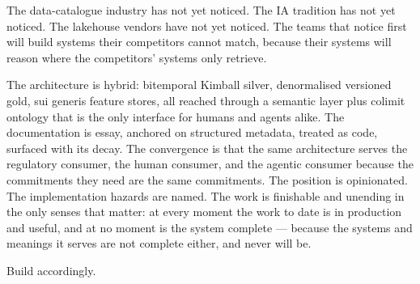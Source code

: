 \documentclass[11pt,a4paper]{article}
\begin{document}
The data-catalogue industry has not yet noticed. The IA tradition has not yet noticed. The lakehouse vendors have not yet noticed. The teams that notice first will build systems their competitors cannot match, because their systems will reason where the competitors' systems only retrieve.

The architecture is hybrid: bitemporal Kimball silver, denormalised versioned gold, sui generis feature stores, all reached through a semantic layer plus colimit ontology that is the only interface for humans and agents alike. The documentation is essay, anchored on structured metadata, treated as code, surfaced with its decay. The convergence is that the same architecture serves the regulatory consumer, the human consumer, and the agentic consumer because the commitments they need are the same commitments. The position is opinionated. The implementation hazards are named. The work is finishable and unending in the only senses that matter: at every moment the work to date is in production and useful, and at no moment is the system complete --- because the systems and meanings it serves are not complete either, and never will be.

Build accordingly.
\end{document}
